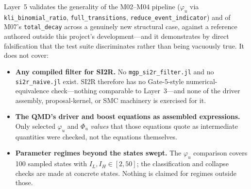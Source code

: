 \documentclass[11pt,leqno]{article}
\newcommand{\code}[1]{\texttt{#1}}
\theoremstyle{plain}
\theoremstyle{definition}
\begin{document}
Layer~5 validates the generality of the M02--M04 pipeline
($\varphi_u$ via \code{kli\_binomial\_ratio}, \code{full\_transitions},
\code{reduce\_event\_indicator}) and of M07's \code{total\_decay} across a
genuinely new structural case, against a reference authored outside this
project's development---and it demonstrates by direct falsification that the
test suite discriminates rather than being vacuously true.  It does not
cover:

\begin{itemize}
  \item \textbf{Any compiled filter for SI2R.}  No
    \code{mgp\_si2r\_filter.jl} and no \code{si2r\_naive.jl} exist.  SI2R
    therefore has no Gate-5-style numerical-equivalence check---nothing
    comparable to Layer~3---and none of the driver assembly, proposal-kernel,
    or SMC machinery is exercised for it.

  \item \textbf{The QMD's driver and boost equations as assembled
    expressions.}  Only selected $\varphi_u$ and $\Phi_u$ \emph{values} that
    those equations quote as intermediate quantities were checked, not the
    equations themselves.

  \item \textbf{Parameter regimes beyond the states swept.}  The $\varphi_u$
    comparison covers 100 sampled states with $I_L, I_H \in [2,50]$; the
    classification and collapse checks are made at concrete states.  Nothing
    is claimed for regimes outside those.
\end{itemize}
\end{document}
